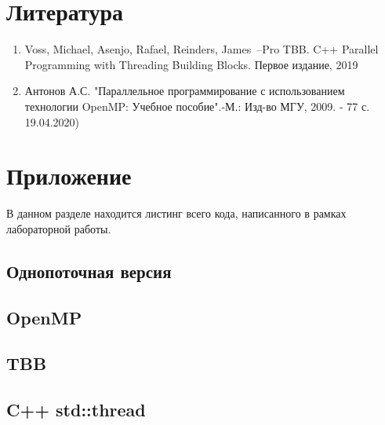 \documentclass{report}
\begin{document}
\newpage
\section{Литература}
\begin{enumerate}
\item Voss, Michael, Asenjo, Rafael, Reinders, James~--Pro TBB. C++ Parallel Programming with Threading Building Blocks. Первое издание, 2019
\item Антонов А.С. "Параллельное программирование с использованием технологии OpenMP: Учебное пособие".-М.: Изд-во МГУ, 2009. - 77 с. 19.04.2020)
\end{enumerate}



\newpage
\section{Приложение}
В данном разделе находится листинг всего кода, написанного в рамках лабораторной работы.

\subsection{Однопоточная версия}




\subsection{OpenMP}




\subsection{TBB}




\subsection{C++ std::thread}



\end{document}
